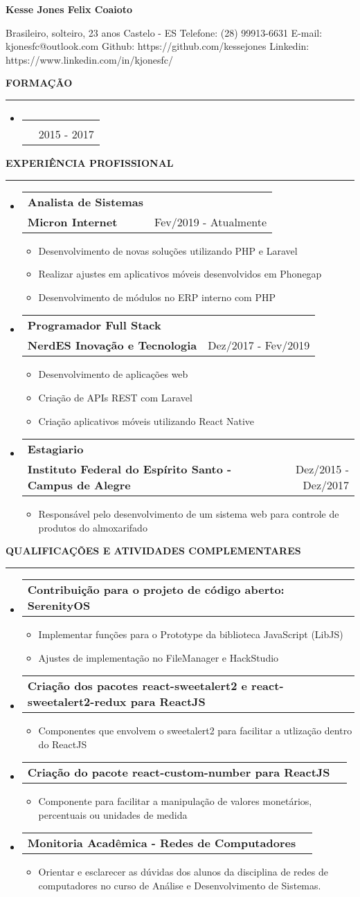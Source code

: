 \documentclass[a4paper,10pt]{article}
\makeatletter
\newcommand{\EducationItem}[3]{
    \item
    \begin{tabular*}{0.93\textwidth}[t]{l@{\extracolsep{\fill}}r}
        \normalfont{#1} & \\
        \small\normalfont{#2} & \scriptsize#3
    \end{tabular*}
}
\newcommand{\WorkExpItem}[3]{
    \item
        \begin{tabular*}{0.93\textwidth}[t]{l@{\extracolsep{\fill}}r}
            \textbf{#1} & \\
            \small\textbf{#2} & \scriptsize#3 \\
        \end{tabular*}
}
\newcommand{\WorkExpActivitiesBegin}[0]{
    \vspace{-5pt}\begin{itemize}
}
\newcommand{\WorkExpActivitiesItem}[1]{
    \vspace{-2pt}\item[]\small #1
}
\newcommand{\WorkExpActivitiesEnd}[0]{
    \end{itemize}\vspace{-7pt}
}
\newcommand{\ProjectItem}[2]{
    \item
        \begin{tabular*}{0.93\textwidth}[t]{l@{\extracolsep{\fill}}r}
            \textbf{#1} & \footnotesize#2
        \end{tabular*}
}
\newcommand{\ProjectActivitiesBegin}[0]{
    \vspace{-5pt}\begin{itemize}
}
\newcommand{\ProjectActivitiesItem}[1]{
    \vspace{-2pt}\item[]\small #1
}
\newcommand{\ProjectActivitiesEnd}[0]{
    \end{itemize}\vspace{-7pt}
}
\newcommand{\SectionTitle}[1]{
    \begin{flushleft}
    \textbf{#1}
    \noindent\textcolor{gray}{\rule{18.5cm}{1px}}
    \end{flushleft}
}
\newcommand{\SectionBegin}[0]{
    \vspace{-16pt}\begin{flushleft}
    \begin{itemize}
}
\newcommand{\SectionEnd}[0]{
    \end{itemize}
    \end{flushleft}\vspace{-2pt}
}
\newcommand{\PersonInformation}[7]{
    \begin{flushleft}
        \begin{LARGE}
            \textbf{#1}
        \end{LARGE}
    \end{flushleft}

    \begin{flushleft}
        #2
        \newline
        #3
        \newline
        Telefone: #4
        \newline
        E-mail: #5
        \newline
        Github: #6
        \newline
        Linkedin: #7
        \newline
    \end{flushleft}
}
\makeatother
\begin{document}

\PersonInformation
    {Kesse Jones Felix Coaioto}
    {Brasileiro, solteiro, 23 anos}
    {Castelo - ES}
    {(28) 99913-6631}
    {kjonesfc@outlook.com}
    {https://github.com/kessejones}
    {https://www.linkedin.com/in/kjonesfc/}

\SectionTitle
    {FORMA\c{C}\~{A}O}
\SectionBegin
    \EducationItem
        {Tecnologia em An\'{a}lise e Desenvolvimento de Sistemas}
        {Instituto Federal do Esp\'{i}rito Santo - Campus de Alegre}
        {2015 - 2017}
\SectionEnd

\SectionTitle
    {EXPERI\^{E}NCIA PROFISSIONAL}
\SectionBegin
    \WorkExpItem
        {Analista de Sistemas}
        {Micron Internet}
        {Fev/2019 - Atualmente}
        \WorkExpActivitiesBegin
            \WorkExpActivitiesItem{Desenvolvimento de novas soluções utilizando PHP e Laravel}
            \WorkExpActivitiesItem{Realizar ajustes em aplicativos móveis desenvolvidos em Phonegap}
            \WorkExpActivitiesItem{Desenvolvimento de módulos no ERP interno com PHP}
        \WorkExpActivitiesEnd
    \WorkExpItem
        {Programador Full Stack}
        {NerdES Inova\c{c}\~{a}o e Tecnologia}
        {Dez/2017 - Fev/2019}
        \WorkExpActivitiesBegin
            \WorkExpActivitiesItem{Desenvolvimento de aplica\c{c}\~{o}es web}
            \WorkExpActivitiesItem{Criação de APIs REST com Laravel}
            \WorkExpActivitiesItem{Criação aplicativos móveis utilizando React Native}
        \WorkExpActivitiesEnd
    \WorkExpItem
        {Estagiario}
        {Instituto Federal do Esp\'{i}rito Santo - Campus de Alegre}
        {Dez/2015 - Dez/2017}
        \WorkExpActivitiesBegin
            \WorkExpActivitiesItem{Respons\'{a}vel pelo desenvolvimento de um sistema web para controle de produtos do  almoxarifado}
        \WorkExpActivitiesEnd
\SectionEnd

\SectionTitle
    {QUALIFICA\c{C}\~{O}ES E ATIVIDADES COMPLEMENTARES}
\SectionBegin
    \ProjectItem
        {Contribuição para o projeto de código aberto: SerenityOS}
        {}
        \ProjectActivitiesBegin
            \ProjectActivitiesItem{Implementar funções para o Prototype da biblioteca JavaScript (LibJS)}
            \ProjectActivitiesItem{Ajustes de implementação no FileManager e HackStudio}
        \ProjectActivitiesEnd
    \ProjectItem
        {Criação dos pacotes react-sweetalert2 e react-sweetalert2-redux para ReactJS}
        {}
        \ProjectActivitiesBegin
            \ProjectActivitiesItem{Componentes que envolvem o sweetalert2 para facilitar a utlização dentro do ReactJS}
        \ProjectActivitiesEnd
    \ProjectItem
        {Criação do pacote react-custom-number para ReactJS}
        {}
        \ProjectActivitiesBegin
            \ProjectActivitiesItem{Componente para facilitar a manipulação de valores monetários, percentuais ou unidades de medida}
        \ProjectActivitiesEnd
    \ProjectItem
        {Monitoria Acadêmica - Redes de Computadores}
        {}
        \ProjectActivitiesBegin
            \ProjectActivitiesItem{Orientar e esclarecer as dúvidas dos alunos da disciplina de redes de computadores no curso de Análise e Desenvolvimento de Sistemas.}
        \ProjectActivitiesEnd
\SectionEnd
    
\end{document}

